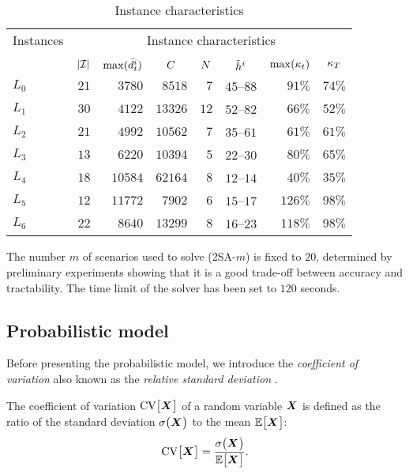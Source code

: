 \begin{table}[ht]
\begin{center}
\begin{tabular*}{\linewidth}{@{\extracolsep{\fill}}lrrrrrrr@{\extracolsep{\fill}}}
\hline
Instances &
\multicolumn{7}{c}{Instance characteristics}
\\\cline{2-8}
\\
& $\card{\REF}$
& $\max(\bar{d}_t^i)$
& \multicolumn{1}{c}{$C$}
& \multicolumn{1}{c}{$N$}
& \multicolumn{1}{c}{$\tilde{h}^i$}
& \multicolumn{1}{c}{$\max\bracket{\kappa_t}$}
& \multicolumn{1}{c}{$\kappa_{T}$}
\\\hline
$L_0$ & $21$ & $3780$ & $8518$ & $7$ & $45$--$88$ & $91\%$ & $74\%$
\\
$L_1$ & $30$ & $4122$ & $13326$ & $12$ & $52$--$82$ & $66\%$ & $52\%$
\\
$L_2$ & $21$ & $4992$ & $10562$ & $7$ & $35$--$61$ & $61\%$ & $61\%$
\\
$L_3$ & $13$ & $6220$ & $10394$ & $5$ & $22$--$30$ & $80\%$ & $65\%$
\\
$L_4$ & $18$ & $10584$ & $62164$ & $8$ & $12$--$14$ & $40\%$ & $35\%$
\\
$L_5$ & $12$ & $11772$ & $7902$ & $6$ & $15$--$17$ & $126\%$ & $98\%$
\\
$L_6$ & $22$ & $8640$ & $13299$ & $8$ & $16$--$23$ & $118\%$ & $98\%$
\\\hline
\end{tabular*}
\caption{Instance characteristics}
\label{tab:instances-characteristics}
\end{center}
\end{table}

The number $m$ of scenarios used to solve (2SA-$m$) is fixed to $20$, determined by preliminary experiments showing that it is a good trade-off between accuracy and tractability. The time limit of the solver has been set to $120$ seconds.





\subsection{Probabilistic model}
\label{sec:PDP:numerical-experiments:probabilistic-model}

Before presenting the probabilistic model, we introduce the \emph{coefficient of variation} also known as the \emph{relative standard deviation} \cite{Everitt1998}.
\begin{defn}
The coefficient of variation $\CV\sqbracket{\va X}$ of a random variable $\va X$ is defined as the ratio of the standard deviation $\sigma\bracket{\va X}$ to the mean $\espe\sqbracket{\va X}$:
\begin{equation}
  \CV\sqbracket{\va X} = \frac{\sigma\bracket{\va X}}{\espe\sqbracket{\va X}}.
\end{equation}
\end{defn}

